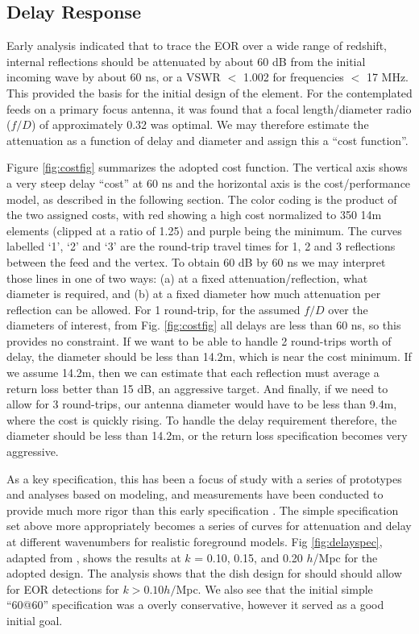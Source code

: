 \documentclass[preprint,11pt]{aastex}
\begin{document}
\subsection{Delay Response}
\label{sec:delayspec}
Early analysis \citep{elementmemo} indicated that to trace the EOR over a wide range of redshift, internal reflections should be attenuated by about 60 dB from the initial incoming wave by about 60 ns, or a VSWR $<$ 1.002 for frequencies $<$ 17 MHz.  This provided the basis for the initial design of the element.    For the contemplated feeds on a primary focus antenna, it was found that a focal length/diameter radio ($f/D$) of approximately 0.32 was optimal.  We may therefore estimate the attenuation as a function of delay and diameter and assign this a ``cost function''.  

Figure \ref{fig:costfig} summarizes the adopted cost function.  
The vertical axis shows a very steep delay ``cost'' at 60 ns and the horizontal axis is the cost/performance model, as described in the following section.  
The color coding is the product of the two assigned costs, with red showing a high cost normalized to 350 14m elements (clipped at a ratio of 1.25) and purple being the minimum.
The curves labelled `1', `2' and `3' are the round-trip travel times for 1, 2 and 3 reflections between the feed and the vertex.
To obtain 60 dB by 60 ns we may interpret those lines in one of two ways:  
(a) at a fixed attenuation/reflection, what diameter is required, and
(b) at a fixed diameter how much attenuation per reflection can be allowed.
For 1 round-trip, for the assumed $f/D$ over the diameters of interest, from Fig. \ref{fig:costfig} all delays are less than 60 ns, so this provides no constraint.   If we want to be able to handle 2 round-trips worth of delay, the diameter should be less than 14.2m, which is near the cost minimum.  If we assume 14.2m, then we can estimate that each reflection must average a return loss better than 15 dB, an aggressive target.  And finally, if we need to allow for 3 round-trips, our antenna diameter would have to be less than 9.4m, where the cost is quickly rising.  To handle the delay requirement therefore, the diameter should be less than 14.2m, or the return loss specification becomes very aggressive.

As a key specification, this has been a focus of study with a series of prototypes and analyses based on modeling, and measurements have been conducted to provide much more rigor than this early specification \citep{ewall-wice_et_al2016-EoXLimits,neben_et_al2016,thyagarajan_et_al2016,patra_et_al0216}.  The simple specification set above more appropriately becomes a series of curves for attenuation and delay at different wavenumbers for realistic foreground models.  Fig \ref{fig:delayspec}, adapted from \cite{thyagarajan_et_al2016}, shows the results at $k$ = 0.10, 0.15, and 0.20 $h$/Mpc for the adopted design.  The analysis shows that
the dish design for should should allow for EOR detections for $k>0.10 h/$Mpc.  We also see that the initial simple ``60@60'' specification was a overly conservative, however it served as a good initial goal.
\end{document}
